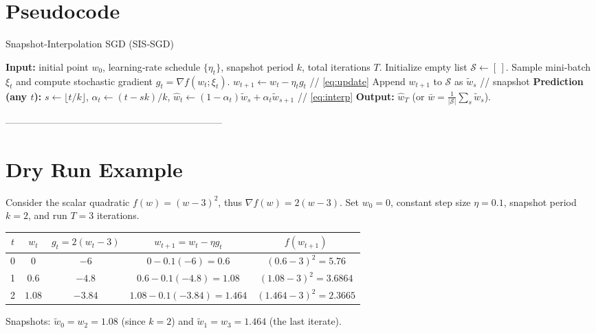 \documentclass{article}
\begin{document}
\section*{Pseudocode}
\begin{algorithm}[H]
\caption{Snapshot‑Interpolation SGD (SIS‑SGD)}
\begin{algorithmic}[1]
\State \textbf{Input:} initial point $w_0$, learning‑rate schedule $\{\eta_t\}$, snapshot period $k$, total iterations $T$.
\State Initialize empty list $\mathcal{S}\leftarrow[\,]$.
    \State Sample mini‑batch $\xi_t$ and compute stochastic gradient $g_t=\nabla f(w_t;\xi_t)$.
    \State $w_{t+1}\gets w_t-\eta_t g_t$ \hfill // \eqref{eq:update}
        \State Append $w_{t+1}$ to $\mathcal{S}$ as $\tilde w_{s}$  \hfill // snapshot
    \EndIf
\EndFor
\State \textbf{Prediction (any $t$):}
\State $s\gets\lfloor t/k\rfloor$, $\alpha_t\gets (t-sk)/k$,
\State $\hat w_t\gets (1-\alpha_t)\tilde w_{s}+\alpha_t\tilde w_{s+1}$ \hfill // \eqref{eq:interp}
\State \textbf{Output:} $\hat w_T$ (or $\bar w=\frac1{|\mathcal{S}|}\sum_{s}\tilde w_s$).
\end{algorithmic}
\end{algorithm}

--------------------------------------------------------------------

\section*{Dry Run Example}
Consider the scalar quadratic $f(w)=(w-3)^2$, thus $\nabla f(w)=2(w-3)$.  
Set $w_0=0$, constant step size $\eta=0.1$, snapshot period $k=2$, and run $T=3$ iterations.

\begin{center}
\begin{tabular}{c|c|c|c|c}
$t$ & $w_t$ & $g_t=2(w_t-3)$ & $w_{t+1}=w_t-\eta g_t$ & $f(w_{t+1})$\\ \hline
0 & $0$ & $-6$ & $0-0.1(-6)=0.6$ & $(0.6-3)^2=5.76$\\
1 & $0.6$ & $-4.8$ & $0.6-0.1(-4.8)=1.08$ & $(1.08-3)^2=3.6864$\\
2 & $1.08$ & $-3.84$ & $1.08-0.1(-3.84)=1.464$ & $(1.464-3)^2=2.3665$\\
\end{tabular}
\end{center}
Snapshots: $\tilde w_{0}=w_{2}=1.08$ (since $k=2$) and $\tilde w_{1}=w_{3}=1.464$ (the last iterate).  
\end{document}
